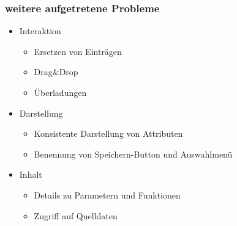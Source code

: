 %
%
%

\begin{frame}
  \frametitle{weitere aufgetretene Probleme}


  \begin{itemize}
    \item Interaktion
          \begin{itemize}
            \item Ersetzen von Einträgen
            \item Drag\&Drop
            \item Überladungen
          \end{itemize}
    \item Darstellung
          \begin{itemize}
            \item Konsistente Darstellung von Attributen
            \item Benennung von Speichern-Button und Auswahlmenü
          \end{itemize}
    \item Inhalt
          \begin{itemize}
            \item Details zu Parametern und Funktionen
            \item Zugriff auf Quelldaten
          \end{itemize}
  \end{itemize}


\end{frame}
